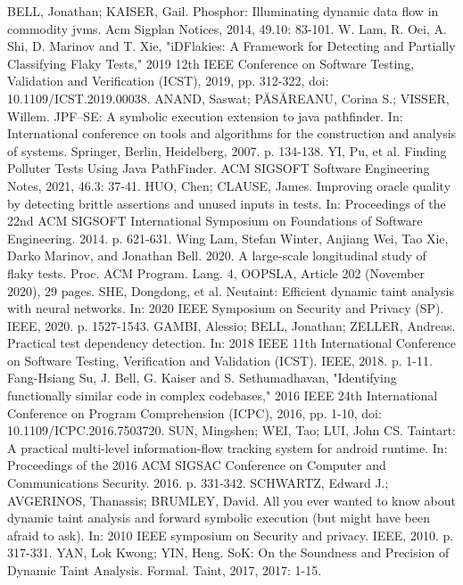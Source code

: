 \documentclass[conference]{IEEEtran}
\begin{document}
\begin{thebibliography}{00}
     BELL, Jonathan; KAISER, Gail. Phosphor: Illuminating dynamic data flow in commodity jvms. Acm Sigplan Notices, 2014, 49.10: 83-101.
     W. Lam, R. Oei, A. Shi, D. Marinov and T. Xie, "iDFlakies: A Framework for Detecting and Partially Classifying Flaky Tests," 2019 12th IEEE Conference on Software Testing, Validation and Verification (ICST), 2019, pp. 312-322, doi: 10.1109/ICST.2019.00038.
     ANAND, Saswat; PĂSĂREANU, Corina S.; VISSER, Willem. JPF–SE: A symbolic execution extension to java pathfinder. In: International conference on tools and algorithms for the construction and analysis of systems. Springer, Berlin, Heidelberg, 2007. p. 134-138.
     YI, Pu, et al. Finding Polluter Tests Using Java PathFinder. ACM SIGSOFT Software Engineering Notes, 2021, 46.3: 37-41.
     HUO, Chen; CLAUSE, James. Improving oracle quality by detecting brittle assertions and unused inputs in tests. In: Proceedings of the 22nd ACM SIGSOFT International Symposium on Foundations of Software Engineering. 2014. p. 621-631.
     Wing Lam, Stefan Winter, Anjiang Wei, Tao Xie, Darko Marinov, and Jonathan Bell. 2020. A large-scale longitudinal study of flaky tests. Proc. ACM Program. Lang. 4, OOPSLA, Article 202 (November 2020), 29 pages.
     SHE, Dongdong, et al. Neutaint: Efficient dynamic taint analysis with neural networks. In: 2020 IEEE Symposium on Security and Privacy (SP). IEEE, 2020. p. 1527-1543.
     GAMBI, Alessio; BELL, Jonathan; ZELLER, Andreas. Practical test dependency detection. In: 2018 IEEE 11th International Conference on Software Testing, Verification and Validation (ICST). IEEE, 2018. p. 1-11.
     Fang-Hsiang Su, J. Bell, G. Kaiser and S. Sethumadhavan, "Identifying functionally similar code in complex codebases," 2016 IEEE 24th International Conference on Program Comprehension (ICPC), 2016, pp. 1-10, doi: 10.1109/ICPC.2016.7503720.
     SUN, Mingshen; WEI, Tao; LUI, John CS. Taintart: A practical multi-level information-flow tracking system for android runtime. In: Proceedings of the 2016 ACM SIGSAC Conference on Computer and Communications Security. 2016. p. 331-342.
     SCHWARTZ, Edward J.; AVGERINOS, Thanassis; BRUMLEY, David. All you ever wanted to know about dynamic taint analysis and forward symbolic execution (but might have been afraid to ask). In: 2010 IEEE symposium on Security and privacy. IEEE, 2010. p. 317-331.
     YAN, Lok Kwong; YIN, Heng. SoK: On the Soundness and Precision of Dynamic Taint Analysis. Formal. Taint, 2017, 2017: 1-15.
\end{thebibliography}
\end{document}
